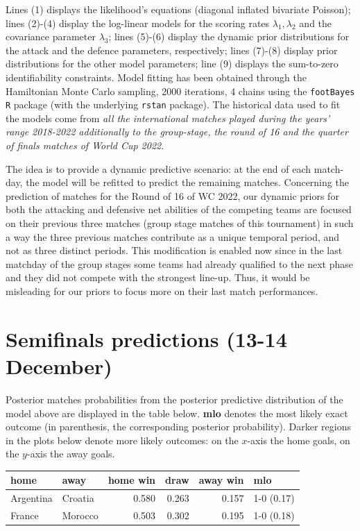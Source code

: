 \documentclass[
  10pt,
]{article}
\begin{document}
Lines (1) displays the likelihood's equations (diagonal inflated
bivariate Poisson); lines (2)-(4) display the log-linear models for the
scoring rates \(\lambda_{1}, \lambda_{2}\) and the covariance parameter
\(\lambda_3\); lines (5)-(6) display the dynamic prior distributions for
the attack and the defence parameters, respectively; lines (7)-(8)
display prior distributions for the other model parameters; line (9)
displays the sum-to-zero identifiability constraints. Model fitting has
been obtained through the Hamiltonian Monte Carlo sampling, 2000
iterations, 4 chains using the \texttt{footBayes} \texttt{R} package
(with the underlying \texttt{rstan} package). The historical data used
to fit the models come from \emph{all the international matches played
during the years' range 2018-2022 additionally to the group-stage, the
round of 16 and the quarter of finals matches of World Cup 2022}.

The idea is to provide a dynamic predictive scenario: at the end of each
match-day, the model will be refitted to predict the remaining matches.
Concerning the prediction of matches for the Round of 16 of WC 2022, our
dynamic priors for both the attacking and defensive net abilities of the
competing teams are focused on their previous three matches (group stage
matches of this tournament) in such a way the three previous matches
contribute as a unique temporal period, and not as three distinct
periods. This modification is enabled now since in the last matchday of
the group stages some teams had already qualified to the next phase and
they did not compete with the strongest line-up. Thus, it would be
misleading for our priors to focus more on their last match
performances.

\hypertarget{semifinals-predictions-13-14-december}{%
\section{Semifinals predictions (13-14
December)}\label{semifinals-predictions-13-14-december}}

Posterior matches probabilities from the posterior predictive
distribution of the model above are displayed in the table below.
\textbf{mlo} denotes the most likely exact outcome (in parenthesis, the
corresponding posterior probability). Darker regions in the plots below
denote more likely outcomes: on the \(x\)-axis the home goals, on the
\(y\)-axis the away goals.

\begin{longtable}[]{@{}llrrrl@{}}
\toprule
home & away & home win & draw & away win & mlo \\
\midrule
\endhead
Argentina & Croatia & 0.580 & 0.263 & 0.157 & 1-0 (0.17) \\
France & Morocco & 0.503 & 0.302 & 0.195 & 1-0 (0.18) \\
\bottomrule
\end{longtable}
\end{document}

